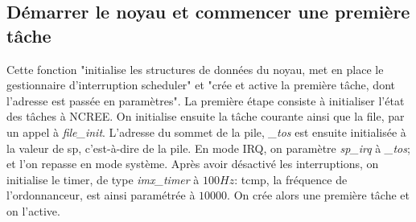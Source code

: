 \subsection{Démarrer le noyau et commencer une première tâche}
Cette fonction "initialise les structures de données du noyau, met en place le gestionnaire d’interruption scheduler" et "crée et active la première tâche, dont l’adresse est passée en paramètres".
La première étape consiste à initialiser l'état des tâches à NCREE. On initialise ensuite la tâche courante ainsi que la file, par un appel à \textit{file\_init}. L'adresse du sommet de la pile, \textit{\_tos} est ensuite initialisée à la valeur de sp, c'est-à-dire de la pile. En mode IRQ, on paramètre \textit{sp\_irq} à \textit{\_tos}; et l'on repasse en mode système. Après avoir désactivé les interruptions, on initialise le timer, de type \textit{imx\_timer} à $100Hz$: tcmp, la fréquence de l'ordonnanceur, est ainsi paramétrée à $10000$. On crée alors une première tâche et on l'active.
%
